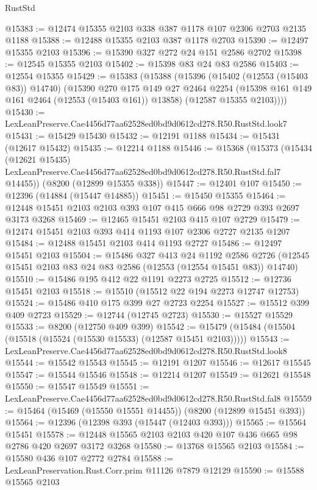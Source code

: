 \begin{lexlean}{RustStd}
\begin{coremodule}
@15383 := @12474 @15355 @2103 @338 @387 @1178 @107 @2306 @2703 @2135 @1188
@15388 := @12488 @15355 @2103 @387 @1178 @2703
@15390 := @12497 @15355 @2103
@15396 := @15390 @327 @272 @24 @151 @2586 @2702
@15398 := @12545 @15355 @2103
@15402 := @15398 @83 @24 @83 @2586
@15403 := @12554 @15355
@15429 := @15383
    (@15388
      (@15396
        (@15402 (@12553 (@15403 @83)) @14740)
        (@15390
          @270
          @175
          @149
          @27
          @2464
          @2254
          (@15398 @161 @149 @161 @2464 (@12553 (@15403 @161)) @13858)
          (@12587 @15355 @2103))))
@15430 := LexLeanPreserve.Cae4456d77aa62528ed0bd9d0612cd278.R50.RustStd.look7
@15431 := @15429 @15430
@15432 := @12191 @1188
@15434 := @15431 (@12617 @15432)
@15435 := @12214 @1188
@15446 := @15368
    (@15373
      (@15434
        (@12621 @15435)
        LexLeanPreserve.Cae4456d77aa62528ed0bd9d0612cd278.R50.RustStd.fal7
        @14455))
    (@8200 (@12899 @15355 @338))
@15447 := @12401 @107
@15450 := @12396 (@14884 (@15447 @14885))
@15451 := @15450 @15355
@15464 := @12448 @15451 @2103 @2103 @393 @107 @415 @666 @98 @2729 @393 @2697 @3173 @3268
@15469 := @12465 @15451 @2103 @415 @107 @2729
@15479 := @12474 @15451 @2103 @393 @414 @1193 @107 @2306 @2727 @2135 @1207
@15484 := @12488 @15451 @2103 @414 @1193 @2727
@15486 := @12497 @15451 @2103
@15504 := @15486
    @327
    @413
    @24
    @1192
    @2586
    @2726
    (@12545 @15451 @2103 @83 @24 @83 @2586 (@12553 (@12554 @15451 @83)) @14740)
@15510 := @15486 @195 @412 @22 @1191 @2273 @2725
@15512 := @12736 @15451 @2103
@15518 := @15510 (@15512 @22 @194 @2273 @12747 @12753)
@15524 := @15486 @410 @175 @399 @27 @2723 @2254
@15527 := @15512 @399 @409 @2723
@15529 := @12744 (@12745 @2723)
@15530 := @15527 @15529
@15533 := @8200 (@12750 @409 @399)
@15542 := @15479 (@15484 (@15504 (@15518 (@15524 (@15530 @15533) (@12587 @15451 @2103)))))
@15543 := LexLeanPreserve.Cae4456d77aa62528ed0bd9d0612cd278.R50.RustStd.look8
@15544 := @15542 @15543
@15545 := @12191 @1207
@15546 := @12617 @15545
@15547 := @15544 @15546
@15548 := @12214 @1207
@15549 := @12621 @15548
@15550 := @15547 @15549
@15551 := LexLeanPreserve.Cae4456d77aa62528ed0bd9d0612cd278.R50.RustStd.fal8
@15559 := @15464 (@15469 (@15550 @15551 @14455)) (@8200 (@12899 @15451 @393))
@15564 := @12396 (@12398 @393 (@15447 (@12403 @393)))
@15565 := @15564 @15451
@15578 := @12448 @15565 @2103 @2103 @420 @107 @436 @665 @98 @2786 @420 @2697 @3172 @3268
@15580 := @13768 @15565 @2103
@15584 := @15580 @436 @107 @2772 @2784
@15588 := LexLeanPreservation.Rust.Corr.prim @11126 @7879 @12129
@15590 := @15588 @15565 @2103

\end{coremodule}
\end{lexlean}
